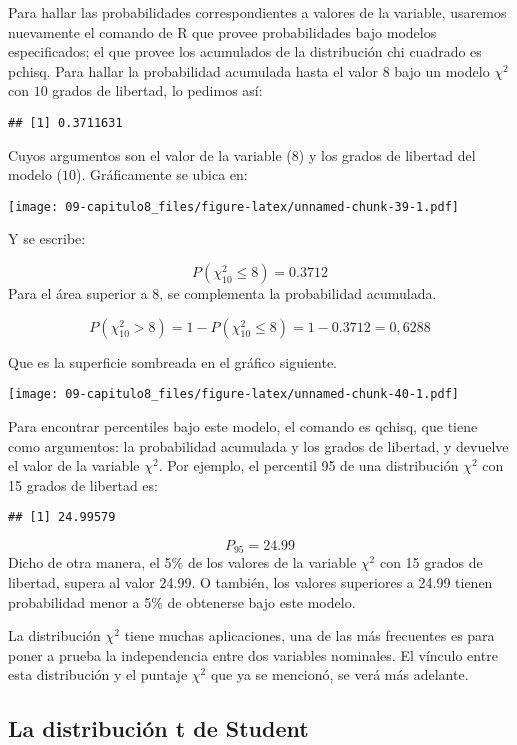 \documentclass[]{article}
\begin{document}
Para hallar las probabilidades correspondientes a valores de la
variable, usaremos nuevamente el comando de R que provee probabilidades
bajo modelos especificados; el que provee los acumulados de la
distribución chi cuadrado es pchisq. Para hallar la probabilidad
acumulada hasta el valor 8 bajo un modelo \(\chi^{2}\) con \(10\) grados
de libertad, lo pedimos así:

\begin{verbatim}
## [1] 0.3711631
\end{verbatim}

Cuyos argumentos son el valor de la variable (\(8\)) y los grados de
libertad del modelo (\(10\)). Gráficamente se ubica en:

\texttt{[image: 09-capitulo8\_files/figure-latex/unnamed-chunk-39-1.pdf]}

Y se escribe:

\[P(\chi_{10}^{2} \leq 8) = 0.3712\] Para el área superior a 8, se
complementa la probabilidad acumulada.

\[P(\chi_{10}^{2} > 8) = 1-P(\chi_{10}^2 \leq 8)= 1-0.3712=0,6288\]

Que es la superficie sombreada en el gráfico siguiente.

\texttt{[image: 09-capitulo8\_files/figure-latex/unnamed-chunk-40-1.pdf]}

Para encontrar percentiles bajo este modelo, el comando es qchisq, que
tiene como argumentos: la probabilidad acumulada y los grados de
libertad, y devuelve el valor de la variable \(\chi^{2}\). Por ejemplo,
el percentil 95 de una distribución \(\chi^{2}\) con 15 grados de
libertad es:

\begin{verbatim}
## [1] 24.99579
\end{verbatim}

\[P_{95}=24.99 \] Dicho de otra manera, el 5\% de los valores de la
variable \(\chi^{2}\) con 15 grados de libertad, supera al valor 24.99.
O también, los valores superiores a 24.99 tienen probabilidad menor a
5\% de obtenerse bajo este modelo.

La distribución \(\chi^{2}\) tiene muchas aplicaciones, una de las más
frecuentes es para poner a prueba la independencia entre dos variables
nominales. El vínculo entre esta distribución y el puntaje \(\chi^{2}\)
que ya se mencionó, se verá más adelante.

\hypertarget{la-distribuciuxf3n-t-de-student}{%
\subsection{La distribución t de
Student}\label{la-distribuciuxf3n-t-de-student}}
\end{document}
